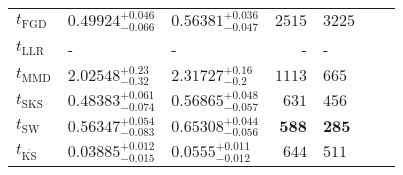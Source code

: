 \begin{tabular}{l|llr|llr}
	\midrule
	$t_{\mathrm{FGD}}$ & $0.49924_{-0.066}^{+0.046}$ & $0.56381_{-0.047}^{+0.036}$ & $2515$ & $3225$ \\
	$t_{\mathrm{LLR}}$ & - & - & - & - \\
	$t_{\mathrm{MMD}}$ & $2.02548_{-0.32}^{+0.23}$ & $2.31727_{-0.2}^{+0.16}$ & $1113$ & $665$ \\
	$t_{\mathrm{SKS}}$ & $0.48383_{-0.074}^{+0.061}$ & $0.56865_{-0.057}^{+0.048}$ & $631$ & $456$ \\
	$t_{\mathrm{SW}}$ & $0.56347_{-0.083}^{+0.054}$ & $0.65308_{-0.056}^{+0.044}$ & ${\mathbf{588}}$ & ${\mathbf{285}}$ \\
	$t_{\overline{\mathrm{KS}}}$ & ${\mathbf{0.03885_{-0.015}^{+0.012}}}$ & ${\mathbf{0.0555_{-0.012}^{+0.011}}}$ & $644$ & $511$ \\
	\bottomrule
\end{tabular}